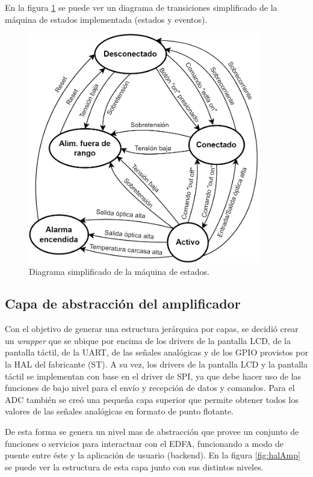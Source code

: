 En la figura \ref{fig:diagFSM} se puede ver un diagrama de transiciones simplificado de la máquina de estados implementada (estados y eventos).

\begin{figure}[H]
\centering
\includegraphics[width=0.9\textwidth]{./Figures/diagFSM.png}
\caption{Diagrama simplificado de la máquina de estados.}
\label{fig:diagFSM}
\end{figure}

\subsection{Capa de abstracción del amplificador}

Con el objetivo de generar una estructura jerárquica por capas, se decidió crear un \textit{wrapper} que se ubique por encima de los drivers de la pantalla LCD, de la pantalla táctil, de la UART, de las señales analógicas y de los GPIO provistos por la HAL del fabricante (ST). A su vez, los drivers de la pantalla LCD y la pantalla táctil se implementan con base en el driver de SPI, ya que debe hacer uso de las funciones de bajo nivel para el envío y recepción de datos y comandos. Para el ADC también se creó una pequeña capa superior que permite obtener todos los valores de las señales analógicas en formato de punto flotante.

De esta forma se genera un nivel mas de abstracción que provee un conjunto de funciones o servicios para interactuar con el EDFA, funcionando a modo de puente entre éste y la aplicación de usuario (backend). En la figura \ref{fig:halAmp} se puede ver la estructura de esta capa junto con sus distintos niveles.

